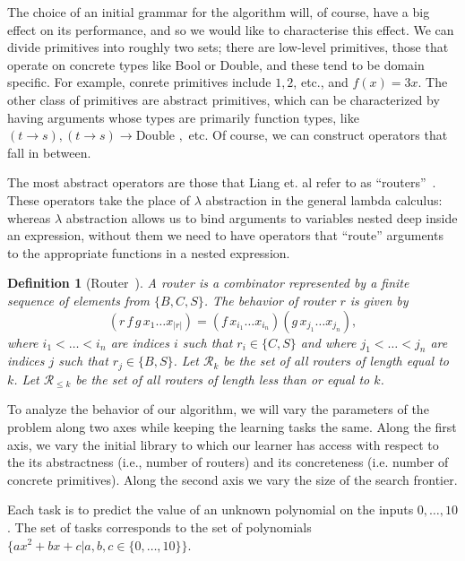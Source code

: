 \documentclass{article}
\newtheorem{definition}{Definition}
\begin{document}
The choice of an initial grammar for the algorithm will, of course,
have a big effect on its performance, and so we would like to
characterise this effect. We can divide primitives into roughly two
sets; there are low-level primitives, those that operate on concrete
types like Bool or Double, and these tend to be domain specific. For
example, conrete primitives include $1, 2$, etc., and $f(x) = 3x$. The
other class of primitives are abstract primitives, which can be
characterized by having arguments whose types are primarily function
types, like $(t \rightarrow s), (t \rightarrow s) \rightarrow \text{
  Double },$ etc. Of course, we can construct operators that fall in
between. 

The most abstract operators are those that Liang et. al refer to as
``routers''~\cite{liang10programs}. These operators take the place of
$\lambda$ abstraction in the general lambda calculus: whereas
$\lambda$ abstraction allows us to bind arguments to variables nested
deep inside an expression, without them we need to have operators that
``route'' arguments to the appropriate functions in a nested
expression. 

\begin{definition}[Router~\cite{liang10programs}] A \emph{router} is a combinator
represented by a finite sequence of elements from $\{B, C, S\}$. The
behavior of router $r$ is given by
\[
(r \, f \, g \, x_1 \dots x_{|r|}) = (f \, x_{i_1} \dots x_{i_n}) (g
\, x_{j_1} \dots x_{j_n}),
\]
where $i_1 < \dots < i_n$ are indices $i$ such that $r_i \in \{C, S\}$
and where $j_1 < \dots < j_n$ are indices $j$ such that $r_j \in \{B,
S\}$. Let $\mathcal{R}_k$ be the set of all routers of length equal to
$k$. Let $\mathcal{R}_{\leq k}$ be the set of all routers of length
less than or equal to $k$.
\end{definition}

To analyze the behavior of our algorithm, we will vary the parameters
of the problem along two axes while keeping the learning tasks the
same. Along the first axis, we vary the initial library to which our
learner has access with respect to the its abstractness (i.e., number
of routers) and its concreteness (i.e. number of concrete
primitives). Along the second axis we vary the size of the search
frontier.

Each task is to predict the value of an unknown polynomial on the
inputs $0, \dots, 10$. The set of tasks corresponds to the set of
polynomials $\{ax^2 + bx + c | a, b, c \in \{0, \dots, 10 \}\}$. 
\end{document}
